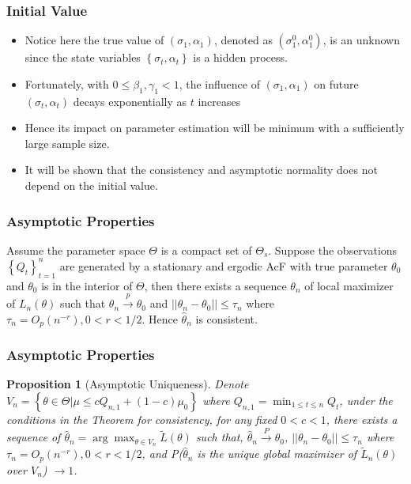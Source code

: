 \documentclass{beamer}
\newcommand{\set}[1]{\left\{#1\right\}}
\newtheorem{prop}{Proposition}[section]
\begin{document}
\begin{frame}
    \frametitle{Initial Value}
    \begin{itemize}
        \item Notice here the true value of $(\sigma_1,\alpha_1)$, denoted as $(\sigma_1^0,\alpha_1^0)$, is an unknown since the state variables $\set{\sigma_t,\alpha_t}$ is a hidden process.
        \medskip
        \item Fortunately, with $0\le \beta_1,\gamma_1<1$, the influence of $(\sigma_1,\alpha_1)$ on future $(\sigma_t,\alpha_t)$ decays exponentially as $t$ increases
        \medskip
        \item Hence its impact on parameter estimation will be minimum with a sufficiently large sample size.
        \medskip
        \item It will be shown that the consistency and asymptotic normality does not depend on the initial value.
    \end{itemize}
\end{frame}

\begin{frame}
    \frametitle{Asymptotic Properties}
    \begin{theorem}[Consistency]
        Assume the parameter space $\Theta$ is a compact set of $\Theta_s$. Suppose the observations $\set{Q_t}_{t=1}^{n}$ are generated
        by a stationary and ergodic AcF with true parameter $\theta_0$ and $\theta_0$ is in the interior of $\Theta$, then there exists a sequence $\theta_n$ of local maximizer of $L_n(\theta)$ such that $\theta_n \stackrel{p}{\to} \theta_0$ and $||\theta_n-\theta_0||\le \tau_n$ where $\tau_n=O_p(n^{-r}), 0<r<1/2$. Hence $\hat{\theta}_n$ is consistent.
    \end{theorem}
\end{frame}

\begin{frame}
    \frametitle{Asymptotic Properties}
    \begin{prop}[Asymptotic Uniqueness]
        Denote $V_n=\set{\theta\in \Theta|\mu\le cQ_{n,1}+(1-c)\mu_0}$ where $Q_{n,1}=\min_{1\le t\le n}Q_t$, under the conditions in the Theorem for consistency, for any fixed $0<c<1$, there exists a sequence of $\hat{\theta}_n=\arg \max_{\theta\in V_n}\tilde{L}(\theta)$ such that, $\hat{\theta}_n\stackrel{P}{\to}\theta_0$, $||\theta_n-\theta_0||\le \tau_n$ where $\tau_n=O_p(n^{-r}), 0<r<1/2$, and P($\hat{\theta}_n$ is the unique global maximizer of $\tilde{L}_n(\theta)$ over $V_n$) $\to 1$. 
    \end{prop}
\end{frame}
\end{document}
